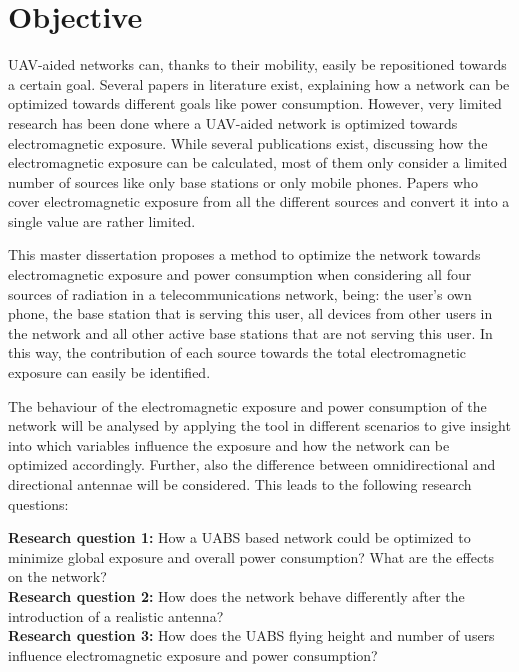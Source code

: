 \section{Objective}
\label{sec:objective}

\gls{UAV}-aided networks can, thanks to their mobility, easily be repositioned towards a certain goal. Several papers 
in literature exist, explaining how a network can be optimized towards different goals like power consumption.
However, very limited
research has been done where a \gls{UAV}-aided network is optimized towards electromagnetic exposure.
While several publications exist, discussing how the electromagnetic exposure can be calculated, most of them only consider a limited number of sources like only base stations or only mobile phones.
Papers who cover electromagnetic exposure from all the different sources and convert it into a single value are rather limited.

This master dissertation proposes a method to optimize the network towards electromagnetic exposure and power consumption
when considering all four sources of radiation in a telecommunications network, being: the user's own phone, 
the base station that is serving this user, 
all devices from other users in the network and all 
other active base stations that are not serving this user. In this way, the contribution of each source towards the total 
electromagnetic exposure can easily be identified. 

The behaviour of the electromagnetic exposure and power consumption of the network will be analysed by applying the tool in different scenarios 
to give insight into which variables influence the exposure and how
the network can be optimized accordingly. Further, also the difference between omnidirectional and directional antennae will 
be considered. This leads to the following research questions:

\textbf{Research question 1:} How a \gls{UABS} based network could be optimized to minimize global exposure and overall power consumption? 
What are the effects on the network?\\

\textbf{Research question 2:} How does the network behave differently after the introduction of a realistic antenna?\\

\textbf{Research question 3:} How does the \gls{UABS} flying height and number of users influence
electromagnetic exposure and power consumption?\\

